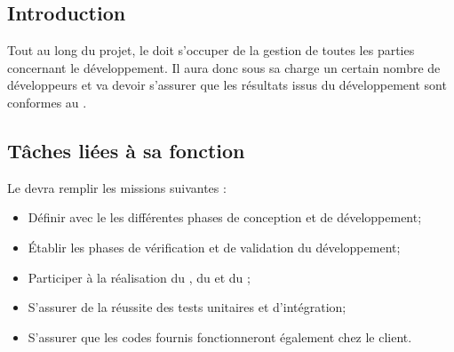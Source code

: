 
\subsection*{Introduction}

Tout au long du projet, le \RD{} doit s'occuper de la gestion de toutes les parties concernant le développement. Il aura donc sous sa charge un certain nombre de développeurs et va devoir s'assurer que les résultats issus du développement sont conformes au \DGQDEUXCourt.

\subsection*{Tâches liées à sa fonction}

Le \RD{} devra remplir les missions suivantes :
\begin{itemize}
	\item Définir avec le \CP{} les différentes phases de conception et de développement;
	\item Établir les phases de vérification et de validation du développement;

	\item Participer à la réalisation du \DSECourt{}, du \DSICourt{} et du \PTVCourt;

	\item S'assurer de la réussite des tests unitaires et d'intégration;
	\item S'assurer que les codes fournis fonctionneront également chez le client.
\end{itemize}